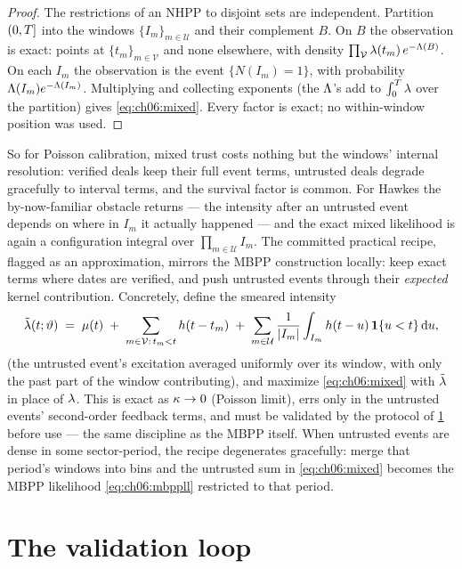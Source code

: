 \begin{proof}
The restrictions of an NHPP to disjoint sets are independent. Partition
$(0,T]$ into the windows $\{I_m\}_{m\in\mathcal U}$ and their
complement $B$. On $B$ the observation is exact: points at
$\{t_m\}_{m\in\mathcal V}$ and none elsewhere, with density
$\prod_{\mathcal V}\lambda(t_m)\, e^{-\Lambda(B)}$. On each $I_m$ the
observation is the event $\{N(I_m)=1\}$, with probability
$\Lambda(I_m)e^{-\Lambda(I_m)}$. Multiplying and collecting exponents (the
$\Lambda$'s add to $\int_0^{T}\lambda$ over the partition) gives
\cref{eq:ch06:mixed}. Every factor is exact; no within-window position was
used.
\end{proof}

So for Poisson calibration, mixed trust costs nothing but the windows'
internal resolution: verified deals keep their full event terms, untrusted
deals degrade gracefully to interval terms, and the survival factor is
common. For Hawkes the by-now-familiar obstacle returns --- the intensity
after an untrusted event depends on where in $I_m$ it actually happened ---
and the exact mixed likelihood is again a configuration integral over
$\prod_{m\in\mathcal U} I_m$. The committed practical recipe, flagged as
an approximation, mirrors the MBPP construction locally: keep exact terms
where dates are verified, and push untrusted events through their
\emph{expected} kernel contribution. Concretely, define the smeared
intensity
\begin{equation}\label{eq:ch06:smeared}
\tilde{\lambda}(t;\vartheta)
 \;=\;
 \mu(t)
 \;+\; \sum_{m\in\mathcal{V}:\, t_m<t} h(t - t_m)
 \;+\; \sum_{m\in\mathcal{U}} \frac{1}{\left|I_m\right|}
 \int_{I_m} h(t-u)\,\mathbf{1}\{u<t\}\,\mathrm{d} u,
\end{equation}
(the untrusted event's excitation averaged uniformly over its window, with
only the past part of the window contributing), and maximize \cref{eq:ch06:mixed} with
$\tilde{\lambda}$ in place of $\lambda$. This is exact as $\kappa\to0$
(Poisson limit), errs only in the untrusted events' second-order feedback
terms, and must be validated by the protocol of \cref{ch06:sec:validation}
before use --- the same discipline as the MBPP itself. When untrusted
events are dense in some sector-period, the recipe degenerates gracefully:
merge that period's windows into bins and the untrusted sum in
\cref{eq:ch06:mixed} becomes the MBPP likelihood \cref{eq:ch06:mbppll}
restricted to that period.

\section{The validation loop}\label{ch06:sec:validation}

